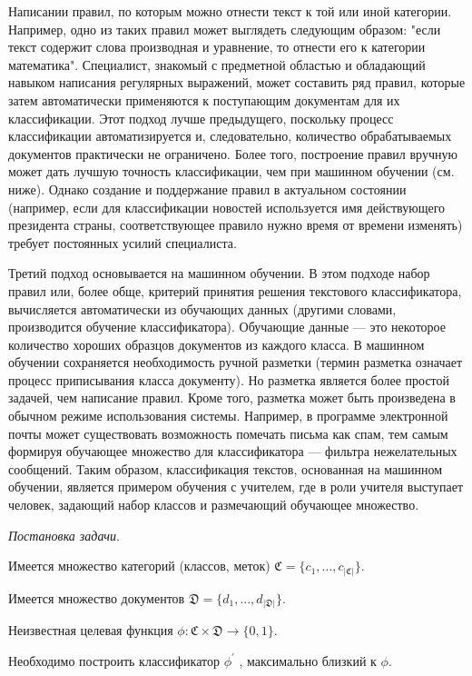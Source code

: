 Написании правил, по которым можно отнести текст к той или иной категории. Например, одно из таких правил может выглядеть следующим образом: "если текст содержит слова производная и уравнение, то отнести его к категории математика". Специалист, знакомый с предметной областью и обладающий навыком написания регулярных выражений, может составить ряд правил, которые затем автоматически применяются к поступающим документам для их классификации. Этот подход лучше предыдущего, поскольку процесс классификации автоматизируется и, следовательно, количество обрабатываемых документов практически не ограничено. Более того, построение правил вручную может дать лучшую точность классификации, чем при машинном обучении (см. ниже). Однако создание и поддержание правил в актуальном состоянии (например, если для классификации новостей используется имя действующего президента страны, соответствующее правило нужно время от времени изменять) требует постоянных усилий специалиста.

Третий подход основывается на машинном обучении. В этом подходе набор правил или, более обще, критерий принятия решения текстового классификатора, вычисляется автоматически из обучающих данных (другими словами, производится обучение классификатора). Обучающие данные — это некоторое количество хороших образцов документов из каждого класса. В машинном обучении сохраняется необходимость ручной разметки (термин разметка означает процесс приписывания класса документу). Но разметка является более простой задачей, чем написание правил. Кроме того, разметка может быть произведена в обычном режиме использования системы. Например, в программе электронной почты может существовать возможность помечать письма как спам, тем самым формируя обучающее множество для классификатора — фильтра нежелательных сообщений. Таким образом, классификация текстов, основанная на машинном обучении, является примером обучения с учителем, где в роли учителя выступает человек, задающий набор классов и размечающий обучающее множество.


\emph{Постановка задачи}.

Имеется множество категорий (классов, меток) $\mathfrak{C} = \{ c_1, ... , c_{ \left| \mathfrak{C} \right| } \}$.

Имеется множество документов $\mathfrak{D} = \{ d_1, ... , d_{ \left| \mathfrak{D} \right| } \}$.

Неизвестная целевая функция $\phi\colon \mathfrak{C} \times \mathfrak{D} \rightarrow \{ 0, 1 \}$.

Необходимо построить классификатор $\phi^\prime$ , максимально близкий к $\phi$.

